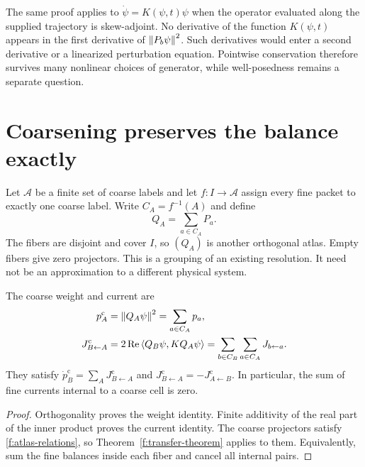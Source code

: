 The same proof applies to $\dot\psi=K(\psi,t)\psi$ when the operator evaluated along the supplied trajectory is skew-adjoint. No derivative of the function $K(\psi,t)$ appears in the first derivative of $\left\lVert P_b\psi\right\rVert^2$. Such derivatives would enter a second derivative or a linearized perturbation equation. Pointwise conservation therefore survives many nonlinear choices of generator, while well-posedness remains a separate question.




\section{Coarsening preserves the balance exactly}\label{f:coarsening}

Let $\mathcal A$ be a finite set of coarse labels and let $f:I\to\mathcal A$ assign every fine packet to exactly one coarse label. Write $C_A=f^{-1}(A)$ and define
\begin{equation}\label{f:coarse-projector}
 Q_A=\sum_{a\in C_A}P_a.
\end{equation}
The fibers are disjoint and cover $I$, so $(Q_A)$ is another orthogonal atlas. Empty fibers give zero projectors. This is a grouping of an existing resolution. It need not be an approximation to a different physical system.

\begin{theorem}\label{f:coarse-theorem}
The coarse weight and current are
\begin{align}
 p_A^{\mathrm c}&=\left\lVert Q_A\psi\right\rVert^2=\sum_{a\in C_A}p_a,\\
 J_{B\leftarrow A}^{\mathrm c}
 &=2\operatorname{Re}\left\langle Q_B\psi,KQ_A\psi\right\rangle
 =\sum_{b\in C_B}\sum_{a\in C_A}J_{b\leftarrow a}.
\end{align}
They satisfy $\dot p_B^{\mathrm c}=\sum_AJ_{B\leftarrow A}^{\mathrm c}$ and
$J_{B\leftarrow A}^{\mathrm c}=-J_{A\leftarrow B}^{\mathrm c}$. In particular, the sum of fine currents internal to a coarse cell is zero.
\end{theorem}

\begin{proof}
Orthogonality proves the weight identity. Finite additivity of the real part of the inner product proves the current identity. The coarse projectors satisfy \eqref{f:atlas-relations}, so Theorem~\ref{f:transfer-theorem} applies to them. Equivalently, sum the fine balances inside each fiber and cancel all internal pairs.
\end{proof}

